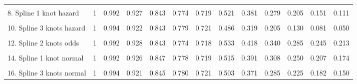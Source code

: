 \documentclass[]{article}
\begin{document}
{\begin{tabular}{lrrrrrrrrrrrr}
\cellcolor{gray!6}{7. Generalised Gamma} & \cellcolor{gray!6}{1} & \cellcolor{gray!6}{0.991} & \cellcolor{gray!6}{0.928} & \cellcolor{gray!6}{0.849} & \cellcolor{gray!6}{0.778} & \cellcolor{gray!6}{0.717} & \cellcolor{gray!6}{0.526} & \cellcolor{gray!6}{0.425} & \cellcolor{gray!6}{0.362} & \cellcolor{gray!6}{0.319} & \cellcolor{gray!6}{0.286} & \cellcolor{gray!6}{0.261}\\
8. Spline 1 knot hazard & 1 & 0.992 & 0.927 & 0.843 & 0.774 & 0.719 & 0.521 & 0.381 & 0.279 & 0.205 & 0.151 & 0.111\\
\cellcolor{gray!6}{9. Spline 2 knots hazard} & \cellcolor{gray!6}{1} & \cellcolor{gray!6}{0.992} & \cellcolor{gray!6}{0.928} & \cellcolor{gray!6}{0.843} & \cellcolor{gray!6}{0.774} & \cellcolor{gray!6}{0.719} & \cellcolor{gray!6}{0.523} & \cellcolor{gray!6}{0.384} & \cellcolor{gray!6}{0.283} & \cellcolor{gray!6}{0.210} & \cellcolor{gray!6}{0.156} & \cellcolor{gray!6}{0.116}\\
10. Spline 3 knots hazard & 1 & 0.994 & 0.922 & 0.843 & 0.779 & 0.721 & 0.486 & 0.319 & 0.205 & 0.130 & 0.081 & 0.050\\
\cellcolor{gray!6}{11. Spline 1 knot odds} & \cellcolor{gray!6}{1} & \cellcolor{gray!6}{0.992} & \cellcolor{gray!6}{0.927} & \cellcolor{gray!6}{0.843} & \cellcolor{gray!6}{0.774} & \cellcolor{gray!6}{0.718} & \cellcolor{gray!6}{0.532} & \cellcolor{gray!6}{0.415} & \cellcolor{gray!6}{0.338} & \cellcolor{gray!6}{0.283} & \cellcolor{gray!6}{0.242} & \cellcolor{gray!6}{0.211}\\
12. Spline 2 knots odds & 1 & 0.992 & 0.928 & 0.843 & 0.774 & 0.718 & 0.533 & 0.418 & 0.340 & 0.285 & 0.245 & 0.213\\
\cellcolor{gray!6}{13. Spline 3 knots odds} & \cellcolor{gray!6}{1} & \cellcolor{gray!6}{0.994} & \cellcolor{gray!6}{0.922} & \cellcolor{gray!6}{0.844} & \cellcolor{gray!6}{0.780} & \cellcolor{gray!6}{0.721} & \cellcolor{gray!6}{0.498} & \cellcolor{gray!6}{0.363} & \cellcolor{gray!6}{0.277} & \cellcolor{gray!6}{0.220} & \cellcolor{gray!6}{0.180} & \cellcolor{gray!6}{0.151}\\
14. Spline 1 knot normal & 1 & 0.992 & 0.926 & 0.847 & 0.778 & 0.719 & 0.515 & 0.391 & 0.308 & 0.250 & 0.207 & 0.174\\
\cellcolor{gray!6}{15. Spline 2 knots normal} & \cellcolor{gray!6}{1} & \cellcolor{gray!6}{0.992} & \cellcolor{gray!6}{0.929} & \cellcolor{gray!6}{0.842} & \cellcolor{gray!6}{0.773} & \cellcolor{gray!6}{0.718} & \cellcolor{gray!6}{0.538} & \cellcolor{gray!6}{0.426} & \cellcolor{gray!6}{0.350} & \cellcolor{gray!6}{0.295} & \cellcolor{gray!6}{0.253} & \cellcolor{gray!6}{0.220}\\
16. Spline 3 knots normal & 1 & 0.994 & 0.921 & 0.845 & 0.780 & 0.721 & 0.503 & 0.371 & 0.285 & 0.225 & 0.182 & 0.150\\
\bottomrule
\end{tabular}}
\end{document}
